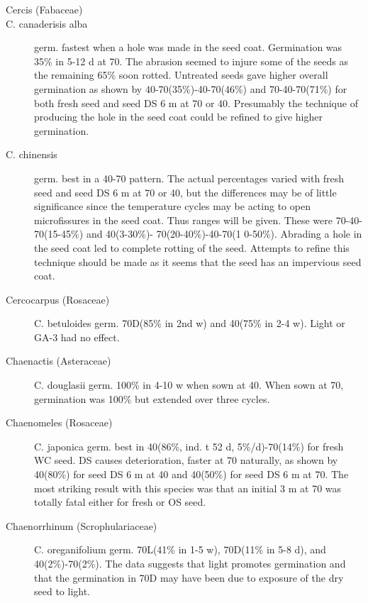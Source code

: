\begin{description}
\item [Cercis (Fabaceae)]
\item [C. canaderisis alba] germ. fastest when a hole was made in the seed coat.
Germination was 35\% in 5-12 d at 70. The abrasion seemed to injure some of the
seeds as the remaining 65\% soon rotted. Untreated seeds gave higher overall
germination as shown by 40-70(35\%)-40-70(46\%) and 70-40-70(71\%) for both fresh
seed and seed DS 6 m at 70 or 40. Presumably the technique of producing the hole in
the seed coat could be refined to give higher germination.
\item [C. chinensis] germ. best in a 40-70 pattern. The actual percentages varied with
fresh seed and seed DS 6 m at 70 or 40, but the differences may be of little
significance since the temperature cycles may be acting to open microfissures in the
seed coat. Thus ranges will be given. These were 70-40-70(15-45\%) and 40(3-30\%)-
70(20-40\%)-40-70(1 0-50\%). Abrading a hole in the seed coat led to complete rotting
of the seed. Attempts to refine this technique should be made as it seems that the
seed has an impervious seed coat.
\item [Cercocarpus (Rosaceae)] C. betuloides germ. 70D(85\% in 2nd w) and
40(75\% in 2-4 w). Light or GA-3 had no effect.
\item [Chaenactis (Asteraceae)] C. douglasii germ. 100\% in 4-10 w when sown
at 40. When sown at 70, germination was 100\% but extended over three cycles.
\item [Chaenomeles (Rosaceae)] C. japonica germ. best in 40(86\%, ind. t 52 d,
5\%/d)-70(14\%) for fresh WC seed. DS causes deterioration, faster at 70 naturally, as
shown by 40(80\%) for seed DS 6 m at 40 and 40(50\%) for seed DS 6 m at 70. The
most striking result with this species was that an initial 3 m at 70 was totally fatal either
for fresh or OS seed.
\item [Chaenorrhinum (Scrophulariaceae)] C. oreganifolium germ. 70L(41\% in
1-5 w), 70D(11\% in 5-8 d), and 40(2\%)-70(2\%). The data suggests that light promotes
germination and that the germination in 70D may have been due to exposure of the
dry seed to light.


\end{description}

